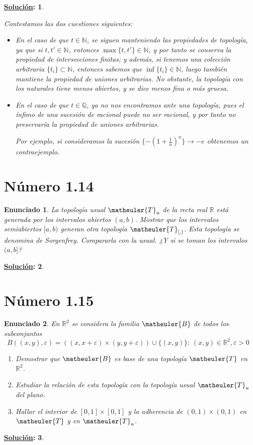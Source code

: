 \documentclass[10pt,a4paper,openright]{book}
\theoremstyle{break}
\newtheorem*{enun}{Enunciado}
\newtheorem*{sol}{\underline{Solución}:}
\begin{document}
\begin{sol}
\begin{enumerate}[label={(\arabic*)}]
\end{enumerate}
Contestamos las dos cuestiones siguientes:
\begin{itemize}
\item En el caso de que $t \in \mathbb{N}$, se siguen manteniendo las propiedades de topología, ya que si $t,t' \in \mathbb{N}$, entonces $\max \{t,t'\} \in \mathbb{N}$, y por tanto se conserva la propiedad de intersecciones finitas; y además, si tenemos una colección arbitraria $\{t_i\} \subset \mathbb{N}$, entonces sabemos que $\inf \{t_i\} \in \mathbb{N}$, luego también mantiene la propiedad de uniones arbitrarias. No obstante, la topología con los naturales tiene menos abiertos, y se dice menos fina o más gruesa.
\item En el caso de que $t \in \mathbb{Q}$, ya no nos encontramos ante una topología, pues el ínfimo de una sucesión de racional puede no ser racional, y por tanto no preservaría la propiedad de uniones arbitrarias.

Por ejemplo, si consideramos la sucesión $\displaystyle \lbrace - \left(1 + \frac{1}{n} \right)^n \} \longrightarrow -e$ obtenemos un contraejemplo.
\end{itemize}
\end{sol}

\section*{Número 1.14}
\begin{enun}
La topología \textit{usual} $\matheuler{T}_u$ de la recta real $\mathbb{R}$ está generada por los intervalos abiertos $(a,b)$. Mostrar que los intervalos semiabiertos $[a,b)$ generan otra topología $\matheuler{T}_{[,)}$. Esta topología se denomina de \textit{Sorgenfrey}. Compararla con la usual. ¿Y si se toman los intervalos $(a,b]$?
\end{enun}
\begin{sol}
\end{sol}

\section*{Número 1.15}
\begin{enun}
En $\mathbb{R}^2$ se considera la familia $\matheuler{B}$ de todos los subconjuntos $$B((x,y), \varepsilon) = ((x,x+\varepsilon) \times (y,y + \varepsilon)) \cup \{(x,y)\} : \  (x,y) \in \mathbb{R}^2, \varepsilon > 0$$
\begin{enumerate}[label={(\arabic*)}]
\item Demostrar que $\matheuler{B}$ es base de una topología $\matheuler{T}$ en $\mathbb{R}^2$.
\item Estudiar la relación de esta topología con la topología usual $\matheuler{T}_{u}$ del plano.
\item Hallar el interior de $[0,1] \times [0,1]$ y la adherencia de $(0,1) \times (0,1)$ en $\matheuler{T}$ y en $\matheuler{T}_u$.
\end{enumerate}
\end{enun}
\begin{sol}
\end{sol}
\end{document}
